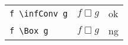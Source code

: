 \documentclass[preview]{standalone}
\newcommand{\tA}[1]{\textcolor{cA}{#1}}
\newcommand{\tD}[1]{\textcolor{cD}{#1}}
\DeclareMathOperator{\infConv}{\Box}
\begin{document}
\begin{table}[H]
    \centering
    \begin{tabular}{lll}
        \verb|f \infConv g| & $f \infConv g$ & \tA{ok} \\
        \verb|f \Box g|     & $f \Box g$     & \tD{ng} \\
    \end{tabular}
\end{table}
\end{document}
